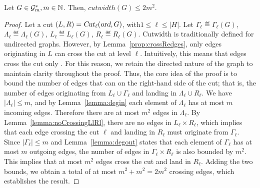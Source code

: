 \begin{theorem}\label{thm:cutwidthBounded}
Let \mbox{$G\in\mathcal{G}^*_m,m\in\mathbb{N}$}. Then, $cutwidth(G)\leq 2m^2$.
\end{theorem}
\begin{proof}
Let a cut \mbox{$(L,R)=\textsl{Cut}_\ell(\textsl{ord},G)$}, with$1\leq\ell\leq|H|$. Let $\Gamma_\ell\eqdef \Gamma_\ell(G)$, $\Lambda_\ell\eqdef\Lambda_\ell(G)$, $L_\ell\eqdef L_\ell(G)$, $R_\ell\eqdef R_\ell(G)$. Cutwidth is traditionally defined for undirected graphs. However, by Lemma~\ref{prop:crossRedges}, only edges originating in $L$ can cross the cut at level $\ell$. Intuitively, this means that edges cross the cut only . For this reason, we retain the directed nature of the graph to maintain clarity throughout the proof. Thus, the core idea of the proof is to bound the number of edges that can  on the right-hand side of the cut; that is, the number of edges originating from $L_\ell\cup\Gamma_\ell$ and landing in $\Lambda_\ell\cup R_\ell$. 
We have $|\Lambda_\ell| \leq m$, and by Lemma~\ref{lemma:degin} each element of $\Lambda_\ell$ has at most $m$ incoming edges. Therefore there are at most $m^2$ edges  in $\Lambda_\ell$.
By Lemma~\ref{lemma:noCrossingLlRl}, there are no edges in $L_\ell\times R_\ell$, which implies that each edge crossing the cut $\ell$ and landing in $R_\ell$ must originate from $\Gamma_\ell$. Since $|\Gamma_\ell| \leq m$ and Lemma~\ref{lemma:degout} states that each element of $\Gamma_\ell$ has at most $m$ outgoing edges, the number of edges in $\Gamma_\ell\times R_\ell$ is also bounded by $m^2$. This implies that at most $m^2$ edges cross the cut and land in $R_\ell$.
Adding the two bounds, we obtain a total of at most $m^2+m^2=2m^2$ crossing edges, which establishes the result.

\end{proof}
